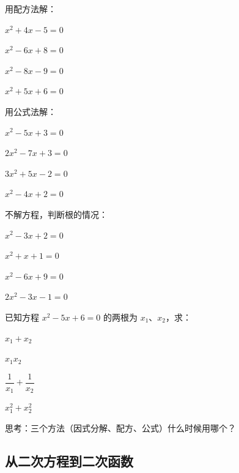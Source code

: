 \begin{exercise}
\item 用配方法解：
  \begin{subexercise}
    \item $x^2 + 4x - 5 = 0$
    \item $x^2 - 6x + 8 = 0$
    \item $x^2 - 8x - 9 = 0$
    \item $x^2 + 5x + 6 = 0$
  \end{subexercise}

\item 用公式法解：
  \begin{subexercise}
    \item $x^2 - 5x + 3 = 0$
    \item $2x^2 - 7x + 3 = 0$
    \item $3x^2 + 5x - 2 = 0$
    \item $x^2 - 4x + 2 = 0$
  \end{subexercise}

\item 不解方程，判断根的情况：
  \begin{subexercise}
    \item $x^2 - 3x + 2 = 0$
    \item $x^2 + x + 1 = 0$
    \item $x^2 - 6x + 9 = 0$
    \item $2x^2 - 3x - 1 = 0$
  \end{subexercise}

\item 已知方程 $x^2 - 5x + 6 = 0$ 的两根为 $x_1$、$x_2$，求：
  \begin{subexercise}
    \item $x_1 + x_2$
    \item $x_1 x_2$
    \item $\dfrac{1}{x_1} + \dfrac{1}{x_2}$
    \item $x_1^2 + x_2^2$
  \end{subexercise}

\item 思考：三个方法（因式分解、配方、公式）什么时候用哪个？
\end{exercise}


\subsection*{从二次方程到二次函数}

